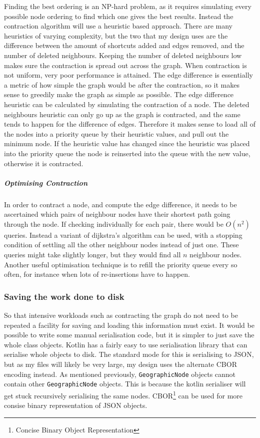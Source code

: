 \documentclass[11pt,twoside,a4paper]{article}
\begin{document}
Finding the best ordering is an NP-hard problem, as it requires simulating every possible node ordering to find which one gives the best results. Instead the contraction algorithm will use a heuristic based approach. There are many heuristics of varying complexity, but the 
two that my design uses are the difference between the amount of shortcuts added and edges removed, and the number of deleted neighbours. Keeping the number of deleted neighbours low makes sure the contraction is spread out across the graph. When contraction is not uniform, very poor performance is attained.
The edge difference is essentially a metric of how simple the graph would be after the contraction, so it makes sense to greedily make the graph as simple as possible. The edge difference heuristic can be calculated by simulating the contraction of a node.
The deleted neighbours heuristic can only go up as the graph is contracted, and the same tends to happen for the difference of edges. Therefore it makes sense to load all of the nodes into a priority queue by their heuristic values,
and pull out the minimum node. If the heuristic value has changed since the heuristic was placed into the priority queue the node is reinserted into the queue with the new value, otherwise it is contracted.    
\subparagraph{Optimising Contraction}
In order to contract a node, and compute the edge difference, it needs to be ascertained which pairs of neighbour nodes have their shortest path going through the node. If checking individually for each pair, there would be $O(n^2)$ queries.
Instead a variant of dijkstra's algorithm can be used, with a stopping condition of settling all the other neighbour nodes instead of just one. These queries might take slightly longer, but they would find all $n$ neighbour nodes.
Another useful optimisation technique is to refill the priority queue every so often, for instance when lots of re-insertions have to happen. 
\subsubsection{Saving the work done to disk}
\label{sec:serialization}
So that intensive workloads such as contracting the graph do not need to be repeated a facility for saving and loading this information must exist.
It would be possible to write some manual serialisation code, but it is simpler to just save the whole class objects. Kotlin has a 
fairly easy to use serialisation library that can serialise whole objects to disk\cite{kotlinh}. The standard mode for this is serialising to JSON, but as my files will likely be very large, my design uses the alternate CBOR encoding instead.
As mentioned previously, \texttt{GeographicNode} objects cannot contain other \texttt{GeographicNode} objects. This is because the kotlin serialiser will get stuck recursively serialising the same nodes. 
CBOR\footnote{Concise Binary Object Representation} can be used for more consise binary representation of JSON objects.
\end{document}
